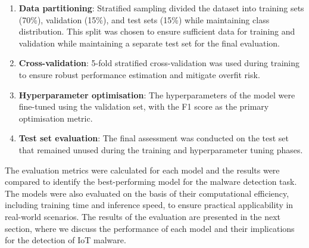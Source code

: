 \begin{enumerate}
    \item \textbf{Data partitioning}: Stratified sampling divided the dataset into training sets (70\%), validation (15\%), and test sets (15\%) while maintaining class distribution. This split was chosen to ensure sufficient data for training and validation while maintaining a separate test set for the final evaluation.
    
    \item \textbf{Cross-validation}: 5-fold stratified cross-validation was used during training to ensure robust performance estimation and mitigate overfit risk.
    
    \item \textbf{Hyperparameter optimisation}: The hyperparameters of the model were fine-tuned using the validation set, with the F1 score as the primary optimisation metric.
    
    \item \textbf{Test set evaluation}: The final assessment was conducted on the test set that remained unused during the training and hyperparameter tuning phases.
\end{enumerate}

The evaluation metrics were calculated for each model and the results were compared to identify the best-performing model for the malware detection task. The models were also evaluated on the basis of their computational efficiency, including training time and inference speed, to ensure practical applicability in real-world scenarios. The results of the evaluation are presented in the next section, where we discuss the performance of each model and their implications for the detection of IoT malware.